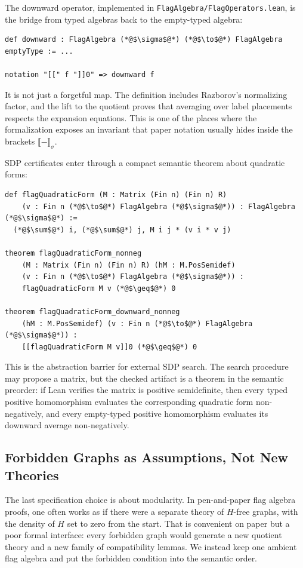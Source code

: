\documentclass{article}
\newcommand{\lean}[1]{\texttt{#1}}
\begin{document}
The downward operator, implemented in \lean{FlagAlgebra/FlagOperators.lean},
is the bridge from typed algebras back to the empty-typed algebra:
\begin{lstlisting}
def downward : FlagAlgebra (*@$\sigma$@*) (*@$\to$@*) FlagAlgebra emptyType := ...

notation "[[" f "]]0" => downward f
\end{lstlisting}
It is not just a forgetful map.  The definition includes Razborov's
normalizing factor, and the lift to the quotient proves that averaging over
label placements respects the expansion equations.  This is one of the places
where the formalization exposes an invariant that paper notation usually hides
inside the brackets $\llbracket-\rrbracket_\sigma$.

SDP certificates enter through a compact semantic theorem about quadratic
forms:
\begin{lstlisting}
def flagQuadraticForm (M : Matrix (Fin n) (Fin n) R)
    (v : Fin n (*@$\to$@*) FlagAlgebra (*@$\sigma$@*)) : FlagAlgebra (*@$\sigma$@*) :=
  (*@$\sum$@*) i, (*@$\sum$@*) j, M i j * (v i * v j)

theorem flagQuadraticForm_nonneg
    (M : Matrix (Fin n) (Fin n) R) (hM : M.PosSemidef)
    (v : Fin n (*@$\to$@*) FlagAlgebra (*@$\sigma$@*)) :
    flagQuadraticForm M v (*@$\geq$@*) 0

theorem flagQuadraticForm_downward_nonneg
    (hM : M.PosSemidef) (v : Fin n (*@$\to$@*) FlagAlgebra (*@$\sigma$@*)) :
    [[flagQuadraticForm M v]]0 (*@$\geq$@*) 0
\end{lstlisting}
This is the abstraction barrier for external SDP search.  The search procedure
may propose a matrix, but the checked artifact is a theorem in the semantic
preorder: if Lean verifies the matrix is positive semidefinite, then every
typed positive homomorphism evaluates the corresponding quadratic form
non-negatively, and every empty-typed positive homomorphism evaluates its
downward average non-negatively.

\subsection{Forbidden Graphs as Assumptions, Not New Theories}
\label{sec:forbidden}

The last specification choice is about modularity.  In pen-and-paper flag
algebra proofs, one often works as if there were a separate theory of
$H$-free graphs, with the density of $H$ set to zero from the start.  That is
convenient on paper but a poor formal interface: every forbidden graph would
generate a new quotient theory and a new family of compatibility lemmas.  We
instead keep one ambient flag algebra and put the forbidden condition into
the semantic order.
\end{document}
